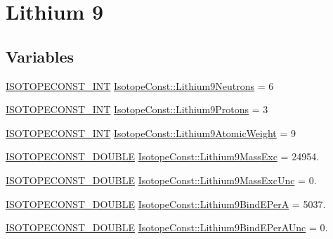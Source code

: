 \hypertarget{group___isotope_const-_lithium-_li9}{}\section{Lithium 9}
\label{group___isotope_const-_lithium-_li9}
\subsection*{Variables}
\begin{DoxyCompactItemize}
\item 
\mbox{\hyperlink{group___isotope_const-_macros_ga5f18360b3e99483a35c32d789e62621c}{I\+S\+O\+T\+O\+P\+E\+C\+O\+N\+S\+T\+\_\+\+I\+NT}} \mbox{\hyperlink{group___isotope_const-_lithium-_li9_gaf5d271863308a4cab3213cad0823ee9f}{Isotope\+Const\+::\+Lithium9\+Neutrons}} = 6
\item 
\mbox{\hyperlink{group___isotope_const-_macros_ga5f18360b3e99483a35c32d789e62621c}{I\+S\+O\+T\+O\+P\+E\+C\+O\+N\+S\+T\+\_\+\+I\+NT}} \mbox{\hyperlink{group___isotope_const-_lithium-_li9_ga264b44046947e03a2b6d885809acb3ad}{Isotope\+Const\+::\+Lithium9\+Protons}} = 3
\item 
\mbox{\hyperlink{group___isotope_const-_macros_ga5f18360b3e99483a35c32d789e62621c}{I\+S\+O\+T\+O\+P\+E\+C\+O\+N\+S\+T\+\_\+\+I\+NT}} \mbox{\hyperlink{group___isotope_const-_lithium-_li9_ga89109d7898b6d7b773a39c4c29f3e1e5}{Isotope\+Const\+::\+Lithium9\+Atomic\+Weight}} = 9
\item 
\mbox{\hyperlink{group___isotope_const-_macros_ga8f45a7272ce02c0b4c65c44636ed719a}{I\+S\+O\+T\+O\+P\+E\+C\+O\+N\+S\+T\+\_\+\+D\+O\+U\+B\+LE}} \mbox{\hyperlink{group___isotope_const-_lithium-_li9_gadbf61ed4e327a81824e824437d6919d0}{Isotope\+Const\+::\+Lithium9\+Mass\+Exc}} = 24954.
\item 
\mbox{\hyperlink{group___isotope_const-_macros_ga8f45a7272ce02c0b4c65c44636ed719a}{I\+S\+O\+T\+O\+P\+E\+C\+O\+N\+S\+T\+\_\+\+D\+O\+U\+B\+LE}} \mbox{\hyperlink{group___isotope_const-_lithium-_li9_gae04b2f2f907650b7a23fb4d551d76b3e}{Isotope\+Const\+::\+Lithium9\+Mass\+Exc\+Unc}} = 0.
\item 
\mbox{\hyperlink{group___isotope_const-_macros_ga8f45a7272ce02c0b4c65c44636ed719a}{I\+S\+O\+T\+O\+P\+E\+C\+O\+N\+S\+T\+\_\+\+D\+O\+U\+B\+LE}} \mbox{\hyperlink{group___isotope_const-_lithium-_li9_gad1dab9add08514c2e964d9d18b10abaa}{Isotope\+Const\+::\+Lithium9\+Bind\+E\+PerA}} = 5037.
\item 
\mbox{\hyperlink{group___isotope_const-_macros_ga8f45a7272ce02c0b4c65c44636ed719a}{I\+S\+O\+T\+O\+P\+E\+C\+O\+N\+S\+T\+\_\+\+D\+O\+U\+B\+LE}} \mbox{\hyperlink{group___isotope_const-_lithium-_li9_gaf2a11264eff3e23c61b686b8a6280003}{Isotope\+Const\+::\+Lithium9\+Bind\+E\+Per\+A\+Unc}} = 0.

\end{DoxyCompactItemize}
